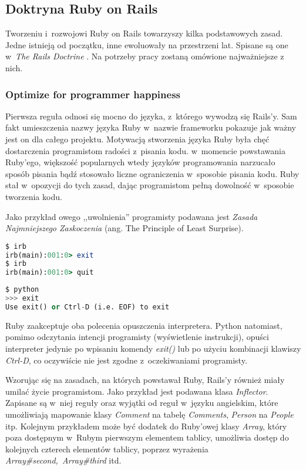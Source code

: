 \documentclass[mgr,oneside]{mgr}
\begin{document}
\subsection{Doktryna Ruby on Rails}
Tworzeniu i~rozwojowi Ruby on Rails towarzyszy kilka podstawowych zasad. Jedne istnieją od początku, inne ewoluowały na przestrzeni lat. Spisane są one w~\emph{The Rails Doctrine} \cite{rails_doctrine}. Na potrzeby pracy zostaną omówione najważniejsze z nich.

\subsubsection{Optimize for programmer happiness}
Pierwsza reguła odnosi się mocno do języka, z~którego wywodzą się Rails'y. Sam fakt umieszczenia nazwy języka Ruby w~nazwie frameworku pokazuje jak ważny jest on dla całego projektu. Motywacją stworzenia języka Ruby była chęć dostarczenia programistom radości z~pisania kodu. w~momencie powstawania Ruby'ego, większość popularnych wtedy języków programowania narzucało sposób pisania bądź stosowało liczne ograniczenia w~sposobie pisania kodu. Ruby stał w~opozycji do tych zasad, dając programistom pełną dowolność w~sposobie tworzenia kodu.

Jako przykład owego ,,uwolnienia'' programisty podawana jest \emph{Zasada Najmniejszego Zaskoczenia} (ang. The Principle of Least Surprise).
\begin{lstlisting}[caption={Wyjście z~interpretera Ruby'ego.},language=Ruby]
$ irb
irb(main):001:0> exit
$ irb
irb(main):001:0> quit
\end{lstlisting}

\begin{lstlisting}[caption={Wyjście z~interpretera Python'a.},language=Python]
$ python
>>> exit
Use exit() or Ctrl-D (i.e. EOF) to exit
\end{lstlisting}
Ruby zaakceptuje oba polecenia opuszczenia interpretera. Python natomiast, pomimo odczytania intencji programisty (wyświetlenie instrukcji), opuści interpreter jedynie po wpisaniu komendy \emph{exit()} lub po użyciu kombinacji klawiszy \emph{Ctrl-D}, co oczywiście nie jest zgodne z~oczekiwaniami programisty.

Wzorując się na zasadach, na których powstawał Ruby, Rails'y również miały umilać życie programistom. Jako przykład jest podawana klasa \emph{Inflector}. Zapisane są w~niej reguły oraz wyjątki od reguł w~języku angielskim, które umożliwiają mapowanie klasy \emph{Comment} na tabelę \emph{Comments}, \emph{Person} na \emph{People} itp. Kolejnym przykładem może być dodatek do Ruby'owej klasy \emph{Array}, który poza dostępnym w~Rubym pierwszym elementem tablicy, umożliwia dostęp do kolejnych czterech elementów tablicy, poprzez wyrażenia \emph{Array\#second,~Array\#third} itd.
\end{document}
